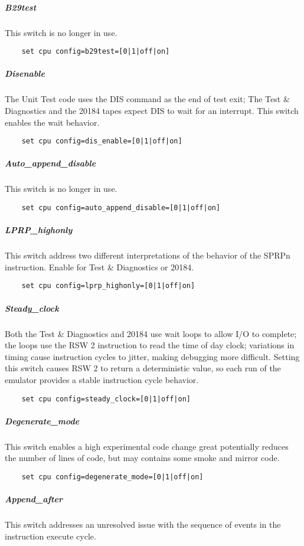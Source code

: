 \documentclass[notitlepage]{report}
\begin{document}
\subparagraph{B29test}
This switch is no longer in use.

\begin{lstlisting}
	set cpu config=b29test=[0|1|off|on]
\end{lstlisting}

\subparagraph{Disenable}
The Unit Test code uses the DIS command as the end of test exit; The Test \& Diagnostics and the 20184 tapes expect DIS to wait for an interrupt. This switch enables the wait behavior.

\begin{lstlisting}
	set cpu config=dis_enable=[0|1|off|on]
\end{lstlisting}

\subparagraph{Auto\_append\_disable}
This switch is no longer in use.
\begin{lstlisting}
	set cpu config=auto_append_disable=[0|1|off|on]
\end{lstlisting}

\subparagraph{LPRP\_highonly}
This switch address two different interpretations of the behavior of the SPRPn instruction. Enable for Test \& Diagnostics or 20184.

\begin{lstlisting}
	set cpu config=lprp_highonly=[0|1|off|on]
\end{lstlisting}

\subparagraph{Steady\_clock}
Both the Test \& Diagnostics and 20184 use wait loops to allow I/O to complete; the loops use the RSW 2 instruction to read the time of day clock; variations in timing cause instruction cycles to jitter, making debugging more difficult. Setting this switch causes RSW 2 to return a deterministic value, so each run of the emulator provides a stable instruction cycle behavior.

\begin{lstlisting}
	set cpu config=steady_clock=[0|1|off|on]
\end{lstlisting}

\subparagraph{Degenerate\_mode}
This switch enables a high experimental code change great potentially reduces the number of lines of code, but may contains some smoke and mirror code.

\begin{lstlisting}
	set cpu config=degenerate_mode=[0|1|off|on]
\end{lstlisting}

\subparagraph{Append\_after}
This switch addresses an unresolved issue with the sequence of events in the instruction execute cycle.
\end{document}
